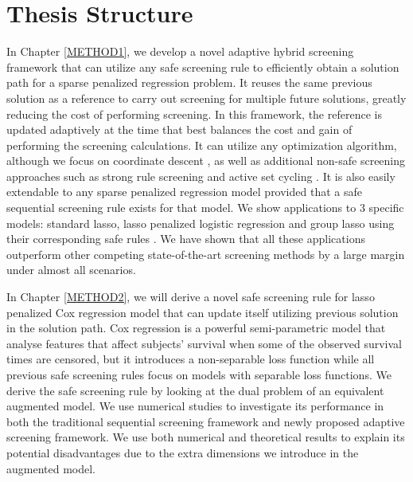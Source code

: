 \section{Thesis Structure}

In Chapter \ref{METHOD1}, we develop a novel adaptive hybrid screening framework that can utilize any safe screening rule to efficiently obtain a solution path for a sparse penalized regression problem. It reuses the same previous solution as a reference to carry out screening for multiple future solutions, greatly reducing the cost of performing screening. In this framework, the reference is updated adaptively at the time that best balances the cost and gain of performing the screening calculations. It can utilize any optimization algorithm, although we focus on coordinate descent \citep{friedman2007pathwise}, as well as additional non-safe screening approaches such as strong rule screening \citep{Tibshirani2012} and active set cycling \citep{lee2007efficient}. It is also easily extendable to any sparse penalized regression model provided that a safe sequential screening rule exists for that model. We show applications to 3 specific models: standard lasso, lasso penalized logistic regression and group lasso using their corresponding safe rules \citep{wang2013lasso,wang2014safe}. We have shown that all these applications outperform other competing state-of-the-art screening methods by a large margin under almost all scenarios.

In Chapter \ref{METHOD2}, we will derive a novel safe screening rule for lasso penalized Cox regression model \citep{cox1972regression} that can update itself utilizing previous solution in the solution path. Cox regression is a powerful semi-parametric model that analyse features that affect subjects' survival when some of the observed survival times are censored, but it introduces a non-separable loss function while all previous safe screening rules focus on models with separable loss functions. We derive the safe screening rule by looking at the dual problem of an equivalent augmented model. We use numerical studies to investigate its performance in both the traditional sequential screening framework and newly proposed adaptive screening framework. We use both numerical and theoretical results to explain its potential disadvantages due to the extra dimensions we introduce in the augmented model.

